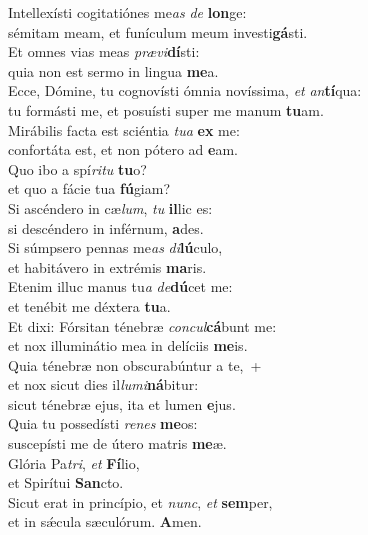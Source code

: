 \evenverse Intellexísti cogitatiónes me\textit{as} \textit{de} \textbf{lon}ge:~\*\\
\evenverse sémitam meam, et funículum meum investi\textbf{gá}sti.\\
\oddverse Et omnes vias meas \textit{præ}\textit{vi}\textbf{dí}sti:~\*\\
\oddverse quia non est sermo in lingua \textbf{me}a.\\
\evenverse Ecce, Dómine, tu cognovísti ómnia novíssima, \textit{et} \textit{an}\textbf{tí}qua:~\*\\
\evenverse tu formásti me, et posuísti super me manum \textbf{tu}am.\\
\oddverse Mirábilis facta est sciéntia \textit{tu}\textit{a} \textbf{ex} me:~\*\\
\oddverse confortáta est, et non pótero ad \textbf{e}am.\\
\evenverse Quo ibo a spí\textit{ri}\textit{tu} \textbf{tu}o?~\*\\
\evenverse et quo a fácie tua \textbf{fú}giam?\\
\oddverse Si ascéndero in cæ\textit{lum}, \textit{tu} \textbf{il}lic es:~\*\\
\oddverse si descéndero in inférnum, \textbf{a}des.\\
\evenverse Si súmpsero pennas me\textit{as} \textit{di}\textbf{lú}culo,~\*\\
\evenverse et habitávero in extrémis \textbf{ma}ris.\\
\oddverse Etenim illuc manus tu\textit{a} \textit{de}\textbf{dú}cet me:~\*\\
\oddverse et tenébit me déxtera \textbf{tu}a.\\
\evenverse Et dixi: Fórsitan ténebræ \textit{con}\textit{cul}\textbf{cá}bunt me:~\*\\
\evenverse et nox illuminátio mea in delíciis \textbf{me}is.\\
\oddverse Quia ténebræ non obscurabúntur a te,~+\\
\oddverse  et nox sicut dies il\textit{lu}\textit{mi}\textbf{ná}bitur:~\*\\
\oddverse sicut ténebræ ejus, ita et lumen \textbf{e}jus.\\
\evenverse Quia tu possedísti \textit{re}\textit{nes} \textbf{me}os:~\*\\
\evenverse suscepísti me de útero matris \textbf{me}æ.\\
\oddverse Glória Pa\textit{tri}, \textit{et} \textbf{Fí}lio,~\*\\
\oddverse et Spirítui \textbf{San}cto.\\
\evenverse Sicut erat in princípio, et \textit{nunc}, \textit{et} \textbf{sem}per,~\*\\
\evenverse et in sǽcula sæculórum. \textbf{A}men.\\
